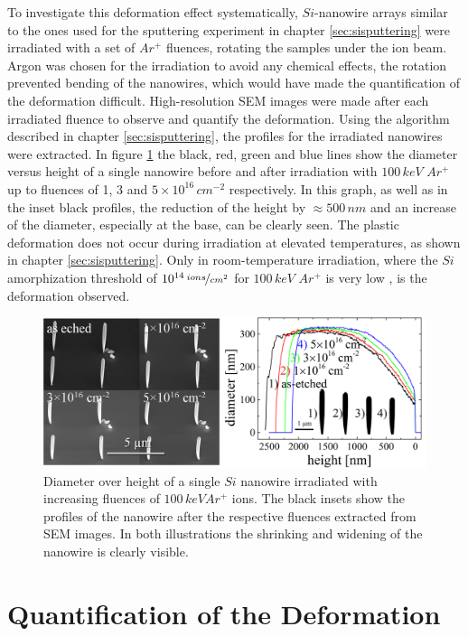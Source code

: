 To investigate this deformation effect systematically, $Si$-nanowire arrays similar to the ones used for the sputtering experiment in chapter \ref{sec:sisputtering} were irradiated with a set of $Ar^+$ fluences, rotating the samples under the ion beam. Argon was chosen for the irradiation to avoid any chemical effects, the rotation prevented bending of the nanowires, which would have made the quantification of the deformation difficult.  High-resolution SEM images were made after each irradiated fluence to observe and quantify the deformation. Using the algorithm described in chapter \ref{sec:sisputtering}, the profiles for the irradiated nanowires were extracted. In figure \ref{deformationprofile} the black, red, green and blue lines show the diameter versus height of a single nanowire before and after irradiation with $100\,keV\,\,Ar^+$ up to fluences of 1, 3 and $5 \times 10^{16}\,cm^{-2}$ respectively. In this graph, as well as in the inset black profiles, the reduction of the height by $\approx 500\,nm$ and an increase of the diameter, especially at the base, can be clearly seen. The plastic deformation does not occur during irradiation at elevated temperatures, as shown in chapter \ref{sec:sisputtering}. Only in room-temperature irradiation, where the $Si$ amorphization threshold of $10^{14}\,\nicefrac{ions}{cm^2}$ for $100\,keV\,\,Ar^+$ is very low \cite{pelaz_ion-beam-induced_2004}, is the deformation observed.

\begin{figure}[thbp]
	\centering
		\includegraphics[width=.8\textwidth]{images/deformationprofileandSEM.jpg}
		\caption{Diameter over height of a single $Si$ nanowire irradiated with increasing fluences of $100\,keV Ar^+$ ions. The black insets show the profiles of the nanowire after the respective fluences extracted from SEM images. In both illustrations the shrinking and widening of the nanowire is clearly visible.} 
	\label{deformationprofile} 
\end{figure}


\section{Quantification of the Deformation}
\label{sec:quantifydeformation}

